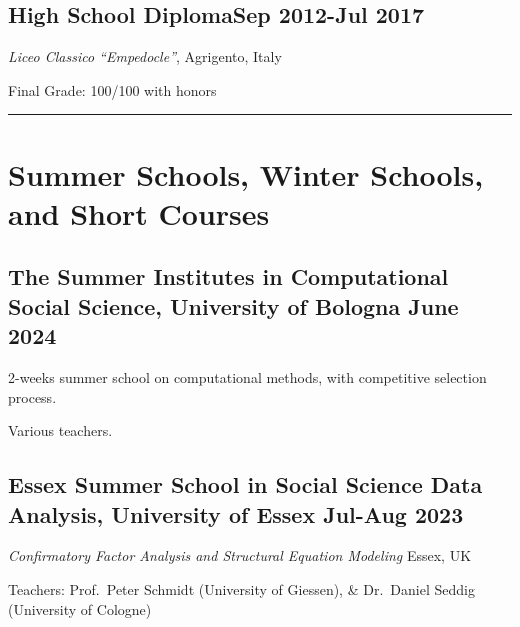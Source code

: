 \documentclass[10pt,]{article}
\providecommand{\tightlist}{%
  \setlength{\itemsep}{0pt}\setlength{\parskip}{0pt}}
\renewenvironment{itemize}{
  \begin{list}{}{
    \setlength{\leftmargin}{1.5em}
  }
}{
  \end{list}
}
\begin{document}
\subsection{\texorpdfstring{High School Diploma\hfill Sep 2012-Jul
2017}{High School DiplomaSep 2012-Jul 2017}}\label{high-school-diplomasep-2012-jul-2017}

\begin{itemize}
\tightlist
\item
  \emph{Liceo Classico ``Empedocle''}, Agrigento, Italy
\item
  Final Grade: 100/100 with honors
\end{itemize}

\bigskip \hrule

\section{Summer Schools, Winter Schools, and Short
Courses}\label{summer-schools-winter-schools-and-short-courses}

\subsection{\texorpdfstring{The Summer Institutes in Computational
Social Science, University of Bologna \hfill  June
2024}{The Summer Institutes in Computational Social Science, University of Bologna June 2024}}\label{the-summer-institutes-in-computational-social-science-university-of-bologna-june-2024}

\begin{itemize}
\tightlist
\item
  2-weeks summer school on computational methods, with competitive
  selection process.
\item
  Various teachers.
\end{itemize}

\subsection{\texorpdfstring{Essex Summer School in Social Science Data
Analysis, University of Essex \hfill  Jul-Aug
2023}{Essex Summer School in Social Science Data Analysis, University of Essex Jul-Aug 2023}}\label{essex-summer-school-in-social-science-data-analysis-university-of-essex-jul-aug-2023}

\begin{itemize}
\tightlist
\item
  \emph{Confirmatory Factor Analysis and Structural Equation Modeling}
  \hfill Essex, UK
\item
  Teachers: Prof.~Peter Schmidt (University of Giessen), \& Dr.~Daniel
  Seddig (University of Cologne)
\end{itemize}
\end{document}

